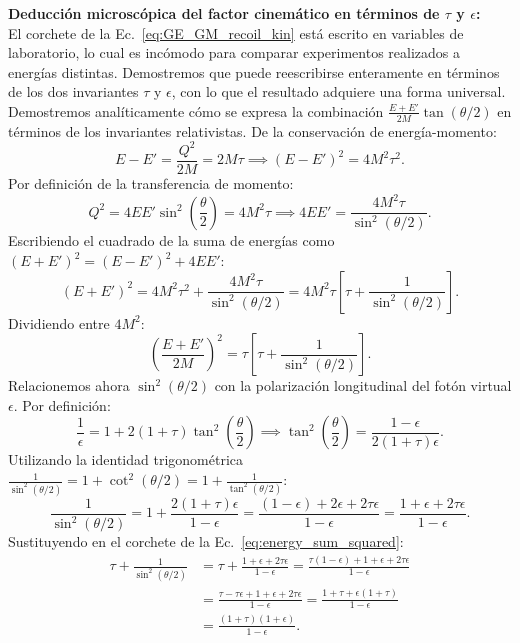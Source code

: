 \documentclass[10pt,a4paper]{article}
\begin{document}
\textbf{Deducción microscópica del factor cinemático en términos de $\tau$ y $\epsilon$:}\\
El corchete de la Ec.~\eqref{eq:GE_GM_recoil_kin} está escrito en variables de laboratorio, lo cual es incómodo para comparar experimentos realizados a energías distintas. Demostremos que puede reescribirse enteramente en términos de los dos invariantes $\tau$ y $\epsilon$, con lo que el resultado adquiere una forma universal. Demostremos analíticamente cómo se expresa la combinación $\frac{E+E'}{2M}\tan(\theta/2)$ en términos de los invariantes relativistas. De la conservación de energía-momento:
\begin{equation}
E - E' = \frac{Q^2}{2M} = 2 M \tau \implies (E - E')^2 = 4 M^2 \tau^2.
\end{equation}
Por definición de la transferencia de momento:
\begin{equation}
Q^2 = 4 E E' \sin^2\left(\frac{\theta}{2}\right) = 4 M^2 \tau \implies 4 E E' = \frac{4 M^2 \tau}{\sin^2(\theta/2)}.
\end{equation}
Escribiendo el cuadrado de la suma de energías como $(E+E')^2 = (E-E')^2 + 4EE'$:
\begin{equation}
(E + E')^2 = 4 M^2 \tau^2 + \frac{4 M^2 \tau}{\sin^2(\theta/2)} = 4 M^2 \tau \left[ \tau + \frac{1}{\sin^2(\theta/2)} \right].
\end{equation}
Dividiendo entre $4M^2$:
\begin{equation}
\left( \frac{E + E'}{2M} \right)^2 = \tau \left[ \tau + \frac{1}{\sin^2(\theta/2)} \right].
\label{eq:energy_sum_squared}
\end{equation}
Relacionemos ahora $\sin^2(\theta/2)$ con la polarización longitudinal del fotón virtual $\epsilon$. Por definición:
\begin{equation}
\frac{1}{\epsilon} = 1 + 2(1+\tau)\tan^2\left(\frac{\theta}{2}\right) \implies \tan^2\left(\frac{\theta}{2}\right) = \frac{1 - \epsilon}{2(1+\tau)\epsilon}.
\label{eq:tan2_epsilon_rel}
\end{equation}
Utilizando la identidad trigonométrica $\frac{1}{\sin^2(\theta/2)} = 1 + \cot^2(\theta/2) = 1 + \frac{1}{\tan^2(\theta/2)}$:
\begin{equation}
\frac{1}{\sin^2(\theta/2)} = 1 + \frac{2(1+\tau)\epsilon}{1 - \epsilon} = \frac{(1 - \epsilon) + 2\epsilon + 2\tau\epsilon}{1 - \epsilon} = \frac{1 + \epsilon + 2\tau\epsilon}{1 - \epsilon}.
\end{equation}
Sustituyendo en el corchete de la Ec.~\eqref{eq:energy_sum_squared}:
\begin{align}
\tau + \frac{1}{\sin^2(\theta/2)} &= \tau + \frac{1 + \epsilon + 2\tau\epsilon}{1 - \epsilon} = \frac{\tau(1 - \epsilon) + 1 + \epsilon + 2\tau\epsilon}{1 - \epsilon} \nonumber \\
&= \frac{\tau - \tau\epsilon + 1 + \epsilon + 2\tau\epsilon}{1 - \epsilon} = \frac{1 + \tau + \epsilon(1 + \tau)}{1 - \epsilon} \nonumber \\
&= \frac{(1 + \tau)(1 + \epsilon)}{1 - \epsilon}.
\end{align}
\end{document}
